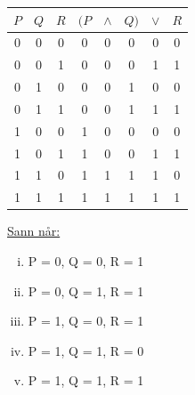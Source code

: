 \documentclass{article}
\begin{document}
\begin{minipage}[t]{0.48\textwidth}
    \centering
    \begin{tabular}{c c c | c c c c c}
        $P$ & $Q$ & $R$ & $(P$ & $\wedge$ & $Q)$ & $\vee$ & $R$ \\
        \hline
        0 & 0 & 0 & 0 & 0 & 0 & 0 & 0 \\
        \rowcolor{lightgray}
        0 & 0 & 1 & 0 & 0 & 0 & 1 & 1 \\
        0 & 1 & 0 & 0 & 0 & 1 & 0 & 0 \\
        \rowcolor{lightgray}
        0 & 1 & 1 & 0 & 0 & 1 & 1 & 1 \\
        1 & 0 & 0 & 1 & 0 & 0 & 0 & 0 \\
        \rowcolor{lightgray}
        1 & 0 & 1 & 1 & 0 & 0 & 1 & 1 \\
        \rowcolor{lightgray}
        1 & 1 & 0 & 1 & 1 & 1 & 1 & 0 \\
        \rowcolor{lightgray} 
        1 & 1 & 1 & 1 & 1 & 1 & 1 & 1 \\
    \end{tabular}
    
    \vspace{1em}

    \underline{Sann når:}
    \begin{enumerate}[(i)]
    \centering
        \item P = 0, Q = 0, R = 1
        \item P = 0, Q = 1, R = 1
        \item P = 1, Q = 0, R = 1
        \item P = 1, Q = 1, R = 0
        \item P = 1, Q = 1, R = 1
    \end{enumerate}
\end{minipage}
\hspace{1em} %
\end{document}
